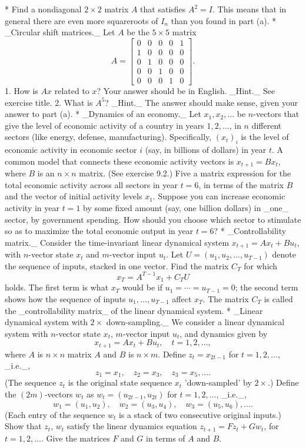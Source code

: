 * Find a nondiagonal \(2\times 2\) matrix \(A\) that satisfies \(A^{2}=I\). This means that in general there are even more squareroots of \(I_{n}\) than you found in part (a).
* _Circular shift matrices._ Let \(A\) be the \(5\times 5\) matrix \[A=\left[\begin{array}{cccc}0&0&0&0&1\\ 1&0&0&0&0\\ 0&1&0&0&0\\ 0&0&1&0&0\\ 0&0&0&1&0\end{array}\right].\] 1. How is \(Ax\) related to \(x\)? Your answer should be in English. _Hint._ See exercise title. 2. What is \(A^{5}\)? _Hint._ The answer should make sense, given your answer to part (a).
* _Dynamics of an economy._ Let \(x_{1},x_{2},\ldots\) be \(n\)-vectors that give the level of economic activity of a country in years \(1,2,\ldots\), in \(n\) different sectors (like energy, defense, manufacturing). Specifically, \((x_{t})_{i}\) is the level of economic activity in economic sector \(i\) (say, in billions of dollars) in year \(t\). A common model that connects these economic activity vectors is \(x_{t+1}=Bx_{t}\), where \(B\) is an \(n\times n\) matrix. (See exercise 9.2.) Five a matrix expression for the total economic activity across all sectors in year \(t=6\), in terms of the matrix \(B\) and the vector of initial activity levels \(x_{1}\). Suppose you can increase economic activity in year \(t=1\) by some fixed amount (say, one billion dollars) in _one_ sector, by government spending. How should you choose which sector to stimulate so as to maximize the total economic output in year \(t=6\)?
* _Controllability matrix._ Consider the time-invariant linear dynamical system \(x_{t+1}=Ax_{t}+Bu_{t}\), with \(n\)-vector state \(x_{t}\) and \(m\)-vector input \(u_{t}\). Let \(U=(u_{1},u_{2},\ldots,u_{T-1})\) denote the sequence of inputs, stacked in one vector. Find the matrix \(C_{T}\) for which \[x_{T}=A^{T-1}x_{1}+C_{T}U\] holds. The first term is what \(x_{T}\) would be if \(u_{1}=\cdots=u_{T-1}=0\); the second term shows how the sequence of inputs \(u_{1},\ldots,u_{T-1}\) affect \(x_{T}\). The matrix \(C_{T}\) is called the _controllability matrix_ of the linear dynamical system.
* _Linear dynamical system with \(2\times\) down-sampling._ We consider a linear dynamical system with \(n\)-vector state \(x_{t}\), \(m\)-vector input \(u_{t}\), and dynamics given by \[x_{t+1}=Ax_{t}+Bu_{t},\quad t=1,2,\ldots,\] where \(A\) is \(n\times n\) matrix \(A\) and \(B\) is \(n\times m\). Define \(z_{t}=x_{2t-1}\) for \(t=1,2,\ldots\), _i.e._, \[z_{1}=x_{1},\quad z_{2}=x_{3},\quad z_{3}=x_{5},\ldots.\] (The sequence \(z_{t}\) is the original state sequence \(x_{t}\) 'down-sampled' by \(2\times\).) Define the \((2m)\)-vectors \(w_{t}\) as \(w_{t}=(u_{2t-1},u_{2t})\) for \(t=1,2,\ldots\), _i.e._, \[w_{1}=(u_{1},u_{2}),\quad w_{2}=(u_{3},u_{4}),\quad w_{3}=(u_{5},u_{6}),\ldots.\] (Each entry of the sequence \(w_{t}\) is a stack of two consecutive original inputs.) Show that \(z_{t}\), \(w_{t}\) satisfy the linear dynamics equation \(z_{t+1}=Fz_{t}+Gw_{t}\), for \(t=1,2,\ldots\). Give the matrices \(F\) and \(G\) in terms of \(A\) and \(B\).
